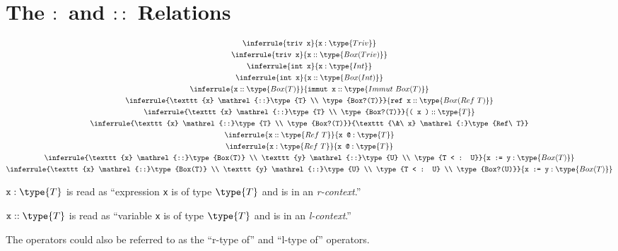 \documentclass{article}
\newcommand\rtypeof{\mathrel{:}}
\newcommand\ltypeof{\mathrel{::}}
\newcommand{\syntax}{\texttt}
\begin{document}
\section*{The $\rtypeof$ and $\ltypeof$ Relations}

\begin{gather}
  \inferrule{\syntax{triv x}}{\syntax{x} \rtypeof \type{Triv}}\\
  \inferrule{\syntax{triv x}}{\syntax{x} \ltypeof \type{Box(Triv)}}\\
  \inferrule{\syntax{int x}}{\syntax{x} \rtypeof \type{Int}}\\
  \inferrule{\syntax{int x}}{\syntax{x} \ltypeof \type{Box(Int)}}\\
  \inferrule{\syntax{x} \ltypeof \type{Box(T)}}{\syntax{immut\ x} \ltypeof \type{Immut\ Box(T)}}\\
  \inferrule{\syntax{x} \ltypeof \type{T} \\ \type{Box?(T)}}{\syntax{ref\ x} \ltypeof \type{Box(Ref\ T)}}\\
  \inferrule{\syntax{x} \ltypeof \type{T} \\ \type{Box?(T)}}{\syntax{(\ x\ )} \ltypeof \type{T}}\\
  \inferrule{\syntax{x} \ltypeof \type{T} \\ \type{Box?(T)}}{\syntax{\&\ x} \rtypeof \type{Ref\ T}}\\
  \inferrule{\syntax{x} \ltypeof \type{Ref\ T}}{\syntax{x\ @} \rtypeof \type{T}}\\
  \inferrule{\syntax{x} \rtypeof \type{Ref\ T}}{\syntax{x\ @} \rtypeof \type{T}}\\
  \inferrule{\syntax{x} \ltypeof \type{Box(T)} \\ \syntax{y} \ltypeof \type{U} \\ \type{T < : U}}{\syntax{x := y}:\type{Box(T)}}\\
  \inferrule{\syntax{x} \ltypeof \type{Box(T)} \\ \syntax{y} \ltypeof \type{U} \\ \type{T < : U} \\ \type{Box?(U)}}{\syntax{x := y}:\type{Box(T)}}
\end{gather}

$\syntax{x} : \type{T}$ is read as ``expression \syntax{x} is of type
$\type{T}$ and is in an \textit{r-context}.''

$\syntax{x} :: \type{T}$ is read as ``variable \syntax{x} is of type $\type{T}$
and is in an \textit{l-context}.''

The operators could also be referred to as the ``r-type of'' and ``l-type of''
operators.
\end{document}
